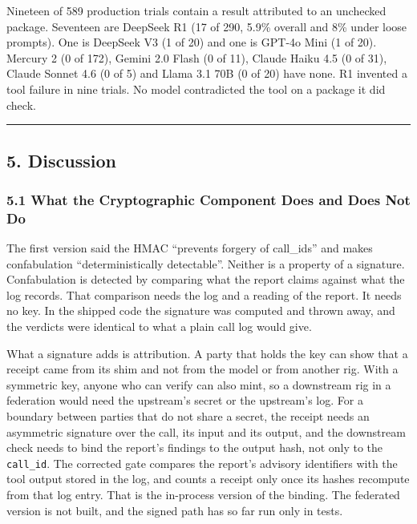 \documentclass[
]{article}
\newcounter{none} %
\begin{document}
Nineteen of 589 production trials contain a result attributed to an
unchecked package. Seventeen are DeepSeek R1 (17 of 290, 5.9\% overall
and 8\% under loose prompts). One is DeepSeek V3 (1 of 20) and one is
GPT-4o Mini (1 of 20). Mercury 2 (0 of 172), Gemini 2.0 Flash (0 of 11),
Claude Haiku 4.5 (0 of 31), Claude Sonnet 4.6 (0 of 5) and Llama 3.1 70B
(0 of 20) have none. R1 invented a tool failure in nine trials. No model
contradicted the tool on a package it did check.

\begin{center}\rule{0.5\linewidth}{0.5pt}\end{center}

\subsection{5. Discussion}\label{discussion}

\subsubsection{5.1 What the Cryptographic Component Does and Does Not
Do}\label{what-the-cryptographic-component-does-and-does-not-do}

The first version said the HMAC ``prevents forgery of call\_ids'' and
makes confabulation ``deterministically detectable''. Neither is a
property of a signature. Confabulation is detected by comparing what the
report claims against what the log records. That comparison needs the
log and a reading of the report. It needs no key. In the shipped code
the signature was computed and thrown away, and the verdicts were
identical to what a plain call log would give.

What a signature adds is attribution. A party that holds the key can
show that a receipt came from its shim and not from the model or from
another rig. With a symmetric key, anyone who can verify can also mint,
so a downstream rig in a federation would need the upstream's secret or
the upstream's log. For a boundary between parties that do not share a
secret, the receipt needs an asymmetric signature over the call, its
input and its output, and the downstream check needs to bind the
report's findings to the output hash, not only to the \texttt{call\_id}.
The corrected gate compares the report's advisory identifiers with the
tool output stored in the log, and counts a receipt only once its hashes
recompute from that log entry. That is the in-process version of the
binding. The federated version is not built, and the signed path has so
far run only in tests.
\end{document}
